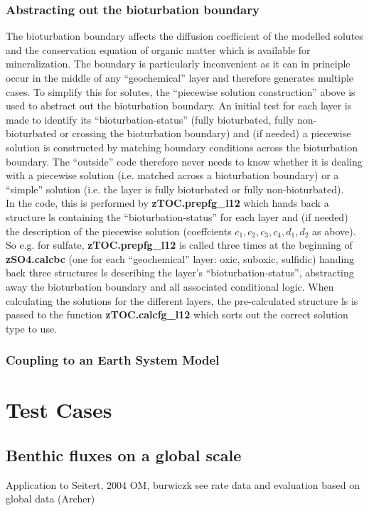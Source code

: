 \documentclass[gmd, manuscript]{copernicus}
\begin{document}
\subsubsection*{Abstracting out the bioturbation boundary}
The bioturbation boundary affects the diffusion coefficient of the modelled solutes and the conservation equation of organic matter which is available for mineralization. 
The boundary is particularly inconvenient as it can in principle occur in the middle of any ``geochemical'' layer and therefore generates multiple cases. 
To simplify this for solutes, the ``piecewise solution construction'' above is used to abstract out the bioturbation boundary. 
An initial test for each layer is made to identify its ``bioturbation-status'' (fully bioturbated, fully non-bioturbated or crossing the bioturbation boundary) and (if needed) a piecewise solution is 
constructed by matching boundary conditions across the bioturbation boundary. 
The ``outside'' code therefore never needs to know whether it is dealing with a piecewise solution (i.e. matched across a bioturbation boundary) or a ``simple'' solution (i.e. the layer is fully bioturbated
or fully non-bioturbated).\\[1em]
In the code, this is performed by \textsf{\textbf{zTOC.prepfg\_l12}} which hands back a structure \textsf{ls} containing the ``bioturbation-status'' for each layer and (if needed) 
the description of the piecewise solution (coeffcients $c_1, c_2, c_3, c_4, d_1, d_2$ as above). So e.g. for sulfate, \textsf{\textbf{zTOC.prepfg\_l12}} is called three times at the beginning of \textsf{\textbf{zSO4.calcbc}} 
(one for each ``geochemical'' layer: oxic, suboxic, sulfidic) handing back three structures \textsf{ls} describing the layer's ``bioturbation-status'', abstracting away the bioturbation boundary and all associated conditional logic. 
When calculating the solutions for the different layers, the pre-calculated structure \textsf{ls} is passed to the function \textsf{\textbf{zTOC.calcfg\_l12}} which sorts out the correct
solution type to use.

\subsubsection{Coupling to an Earth System Model}\label{subsubsec:ESM_coupling}


\section {Test Cases}
\subsection{Benthic fluxes on a global scale}
Application to Seitert, 2004 OM, burwiczk see rate data and evaluation based on global data (Archer)
\end{document}
